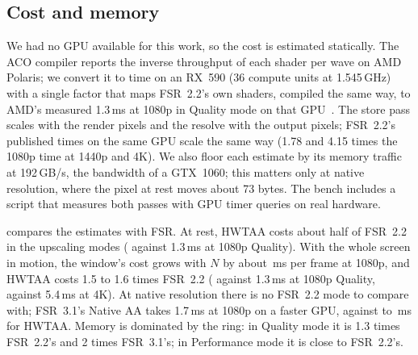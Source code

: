 \documentclass[11pt,a4paper]{article}
\begin{document}
\subsection{Cost and memory}
\label{sec:cost}

\begin{table}[t]
\centering
\caption{Cost and memory. HWTAA: estimated time on an RX~590 (GTX~1060 class) with the pixels at rest and with the whole screen in motion, the worst case; memory in MB with the ring, history, locks, object identifiers and reactive mask. \textsuperscript{a}FSR~2.2: measured by AMD on an RX~590~\cite{amd2023fsr2}. \textsuperscript{b}FSR~3.1: AMD's figures for an RX~5700~XT~\cite{amd2024fsr3,amd2025fsr31manual}, a faster GPU, for reference only.}
\label{tab:cost}
\small

\end{table}

We had no GPU available for this work, so the cost is estimated statically. The ACO compiler reports the inverse throughput of each shader per wave on AMD Polaris; we convert it to time on an RX~590 (36 compute units at 1.545\,GHz) with a single factor that maps FSR~2.2's own shaders, compiled the same way, to AMD's measured 1.3\,ms at 1080p in Quality mode on that GPU~\cite{amd2023fsr2}. The store pass scales with the render pixels and the resolve with the output pixels; FSR~2.2's published times on the same GPU scale the same way (1.78 and 4.15 times the 1080p time at 1440p and 4K). We also floor each estimate by its memory traffic at 192\,GB/s, the bandwidth of a GTX~1060; this matters only at native resolution, where the pixel at rest moves about 73 bytes. The bench includes a script that measures both passes with GPU timer queries on real hardware.

 compares the estimates with FSR. At rest, HWTAA costs about half of FSR~2.2 in the upscaling modes (\nMsStillQHd{} against 1.3\,ms at 1080p Quality). With the whole screen in motion, the window's cost grows with $N$ by about \nMsPerFrameHd{}\,ms per frame at 1080p, and HWTAA costs 1.5 to 1.6 times FSR~2.2 (\nMsMovingQHd{} against 1.3\,ms at 1080p Quality, \nMsMovingQUhd{} against 5.4\,ms at 4K). At native resolution there is no FSR~2.2 mode to compare with; FSR~3.1's Native AA takes 1.7\,ms at 1080p on a faster GPU, against \nMsStillNatHd{} to \nMsMovingNatHd{}\,ms for HWTAA. Memory is dominated by the ring: in Quality mode it is 1.3 times FSR~2.2's and 2 times FSR~3.1's; in Performance mode it is close to FSR~2.2's.
\end{document}
